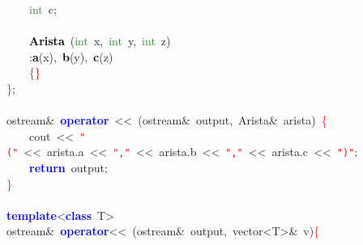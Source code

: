 \mbox{}\ \ \ \ \textcolor{ForestGreen}{int}\ c\textcolor{BrickRed}{;} \\
\mbox{} \\
\mbox{}\ \ \ \ \textbf{\textcolor{Black}{Arista}}\ \textcolor{BrickRed}{(}\textcolor{ForestGreen}{int}\ x\textcolor{BrickRed}{,}\ \textcolor{ForestGreen}{int}\ y\textcolor{BrickRed}{,}\ \textcolor{ForestGreen}{int}\ z\textcolor{BrickRed}{)} \\
\mbox{}\ \ \ \ \textcolor{BrickRed}{:}\textbf{\textcolor{Black}{a}}\textcolor{BrickRed}{(}x\textcolor{BrickRed}{),}\ \textbf{\textcolor{Black}{b}}\textcolor{BrickRed}{(}y\textcolor{BrickRed}{),}\ \textbf{\textcolor{Black}{c}}\textcolor{BrickRed}{(}z\textcolor{BrickRed}{)} \\
\mbox{}\ \ \ \ \textcolor{Red}{\{\}} \\
\mbox{}\textcolor{Red}{\}}\textcolor{BrickRed}{;} \\
\mbox{} \\
\mbox{}ostream\textcolor{BrickRed}{\&}\ \textbf{\textcolor{Blue}{operator}}\ \textcolor{BrickRed}{\textless{}\textless{}}\ \textcolor{BrickRed}{(}ostream\textcolor{BrickRed}{\&}\ output\textcolor{BrickRed}{,}\ Arista\textcolor{BrickRed}{\&}\ arista\textcolor{BrickRed}{)}\ \textcolor{Red}{\{} \\
\mbox{}\ \ \ \ cout\ \textcolor{BrickRed}{\textless{}\textless{}}\ \texttt{\textcolor{Red}{"{}("{}}}\ \textcolor{BrickRed}{\textless{}\textless{}}\ arista\textcolor{BrickRed}{.}a\ \textcolor{BrickRed}{\textless{}\textless{}}\ \texttt{\textcolor{Red}{"{},"{}}}\ \textcolor{BrickRed}{\textless{}\textless{}}\ arista\textcolor{BrickRed}{.}b\ \textcolor{BrickRed}{\textless{}\textless{}}\ \texttt{\textcolor{Red}{"{},"{}}}\ \textcolor{BrickRed}{\textless{}\textless{}}\ arista\textcolor{BrickRed}{.}c\ \textcolor{BrickRed}{\textless{}\textless{}}\ \texttt{\textcolor{Red}{"{})"{}}}\textcolor{BrickRed}{;} \\
\mbox{}\ \ \ \ \textbf{\textcolor{Blue}{return}}\ output\textcolor{BrickRed}{;} \\
\mbox{}\textcolor{Red}{\}} \\
\mbox{} \\
\mbox{}\textbf{\textcolor{Blue}{template}}\textcolor{BrickRed}{\textless{}}\textbf{\textcolor{Blue}{class}}\ \textcolor{TealBlue}{T}\textcolor{BrickRed}{\textgreater{}} \\
\mbox{}ostream\textcolor{BrickRed}{\&}\ \textbf{\textcolor{Blue}{operator}}\textcolor{BrickRed}{\textless{}\textless{}}\ \textcolor{BrickRed}{(}ostream\textcolor{BrickRed}{\&}\ output\textcolor{BrickRed}{,}\ vector\textcolor{BrickRed}{\textless{}}T\textcolor{BrickRed}{\textgreater{}\&}\ v\textcolor{BrickRed}{)}\textcolor{Red}{\{} \\
